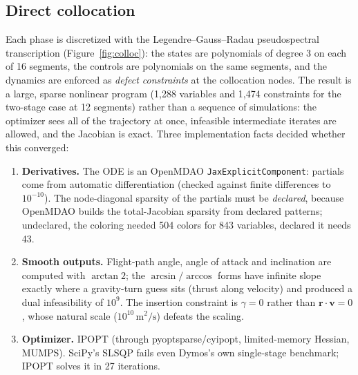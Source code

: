 \documentclass[11pt,a4paper]{article}
\newcommand{\unit}[1]{\,\mathrm{#1}}
\begin{document}
\subsection{Direct collocation}
Each phase is discretized with the Legendre--Gauss--Radau pseudospectral transcription (Figure~\ref{fig:colloc}):
the states are polynomials of degree 3 on each of 16 segments, the controls are polynomials on the same segments,
and the dynamics are enforced as \emph{defect constraints} at the collocation nodes. The result is a large, sparse
nonlinear program (1,288 variables and 1,474 constraints for the two-stage case at 12 segments) rather than a
sequence of simulations: the optimizer sees all of the trajectory at once, infeasible intermediate iterates are
allowed, and the Jacobian is exact. Three implementation facts decided whether this converged:
\begin{enumerate}
  \item \textbf{Derivatives.} The ODE is an OpenMDAO \texttt{JaxExplicitComponent}: partials come from automatic
        differentiation (checked against finite differences to $10^{-10}$). The node-diagonal sparsity of the partials
        must be \emph{declared}, because OpenMDAO builds the total-Jacobian sparsity from declared patterns; undeclared,
        the coloring needed 504 colors for 843 variables, declared it needs 43.
  \item \textbf{Smooth outputs.} Flight-path angle, angle of attack and inclination are computed with $\arctan2$;
        the $\arcsin/\arccos$ forms have infinite slope exactly where a gravity-turn guess sits (thrust along velocity)
        and produced a dual infeasibility of $10^9$. The insertion constraint is $\gamma = 0$ rather than
        $\bm r\cdot\bm v = 0$, whose natural scale ($10^{10}\unit{m^2/s}$) defeats the scaling.
  \item \textbf{Optimizer.} IPOPT (through pyoptsparse/cyipopt, limited-memory Hessian, MUMPS). SciPy's SLSQP fails even
        Dymos's own single-stage benchmark; IPOPT solves it in 27 iterations.
\end{enumerate}
\end{document}
